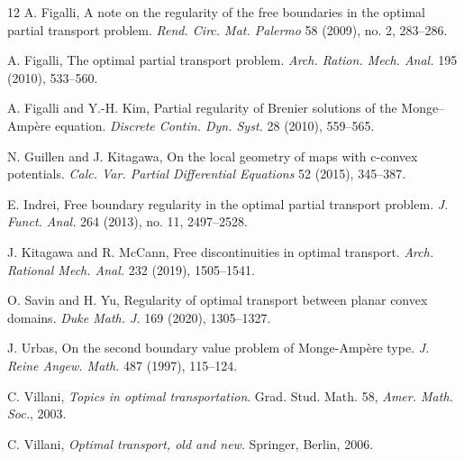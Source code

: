 \documentclass[10pt,a4paper]{amsart}
\theoremstyle{plain}
\newcommand{\0}{\textbf{0}}
\numberwithin{equation}{section}
\numberwithin{equation}{section}
\numberwithin{figure}{section}
\begin{document}
\begin{thebibliography}{12}
A. Figalli, 
A note on the regularity of the free boundaries in the optimal partial transport problem.
 \textit{Rend. Circ. Mat. Palermo} 58 (2009), no. 2, 283--286.
 	    
 A. Figalli, 
 The optimal partial transport problem. 
  \textit{Arch. Ration. Mech. Anal.} 195 (2010), 533--560.
  
 A. Figalli and Y.-H. Kim, 
 Partial regularity of Brenier solutions of the Monge–Amp\`ere equation. 
 \textit{Discrete Contin. Dyn. Syst.} 28 (2010), 559--565.

 N. Guillen and J. Kitagawa,
 On the local geometry of maps with c-convex potentials.
 \textit{Calc. Var. Partial Differential Equations} 52 (2015), 345--387. 

  E. Indrei, Free boundary regularity in the optimal partial transport problem. 
 \textit{J. Funct. Anal.} 264 (2013), no. 11, 2497--2528.   
 

J. Kitagawa and R. McCann,
 Free discontinuities in optimal transport.
       \emph{Arch. Rational Mech. Anal.} 232 (2019), 1505--1541. 


   O. Savin and H. Yu,
    Regularity of optimal transport between planar convex domains. 
    \textit{Duke Math. J.} 169 (2020), 1305--1327.
   
   
 J. Urbas,
    On the second boundary value problem of Monge-Amp\`ere type.
      \textit{J. Reine Angew. Math.}  487 (1997), 115--124.


 C. Villani,
           \emph{Topics in optimal transportation}.  Grad. Stud. Math. 58,
          \textit{Amer. Math. Soc.}, 2003.

 C. Villani,
           \emph{Optimal transport, old and new}.  
           Springer, Berlin, 2006.

\end{thebibliography}
\end{document}
